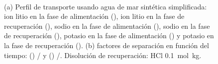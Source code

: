 \begin{figure}[H]
  \centering
    \\
    \caption[Perfil de transporte y factores de separación usando agua de mar sintética simplificada.]{(a) Perfil de transporte usando agua de mar sintética simplificada: ion litio en la fase de alimentación (\protect\squareblck), ion litio en la fase de recuperación (\protect\squarewht), sodio en la fase de alimentación (\protect\triangleupblck), sodio en la fase de recuperación (\protect\triangleupwht), potasio en la fase de alimentación (\protect\circleblck) y potasio en la fase de recuperación (\protect\circlewht).  (b) factores de separación en función del tiempo: (\protect\triangleupblck) / y (\protect\triangleupwht) /.  Disolución de recuperación: HCl 0.1~mol~kg\mnn.}
  \label{fig:SSS1}
\end{figure}



